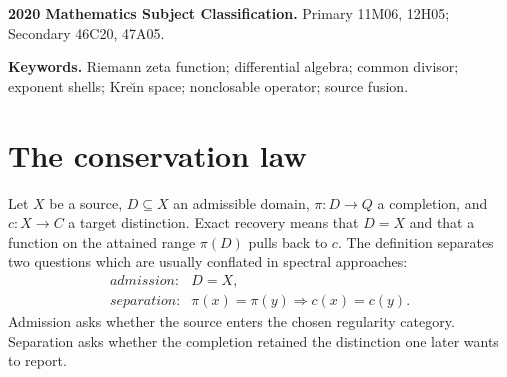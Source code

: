 \documentclass[11pt]{article}
\theoremstyle{definition}
\theoremstyle{remark}
\begin{document}
\begin{abstract}
The resulting law subsumes the audited source mechanisms by one exact defect ledger.  Finite
signature is its linear separation defect, a middle fibre or Tor class its homological defect, a
dense radical its topological defect, an all-orders-flat ideal its filtered defect, and failure of
absolute nuclearity its operator-ideal admission defect.  Wold--Poisson and holomorphic strip
transport are positive pre-completion lifts; Weil, Ward, Sonin, Calkin, and sharp-window
constructions are terminal consumers.  Under unit shell response, finite-Rees reflected sewing,
and invariant scalarization, every source-only Riemann selector is forced to be nonclosable in
breadth and beyond every finite Rees order in depth.  No zero-exclusion or
Riemann-hypothesis claim is made.  A positive escape is nevertheless explicit on every finite
packet: phasing the calibrated Julia--Gamma exterior current by its own source height makes it
Hermitian, with nonnegative energy before the first phase wrap and strict positivity whenever two
retained heights differ.  A phase-free diameter theorem then shows that every uniformly bounded
complex polarization of this exterior current is too small by a logarithmic factor on the
first-clock prime blocks, including arbitrarily wrapped and packet-dependent phases.
The full Jordan positive part of the rank-two exterior matrix has the same logarithmic ceiling,
so terminal spectral projection cannot recover the missing capacity.
On the singular depth channel, the literal Wold-vacuum truncations have reporter
$H_N(-u\Xi'/\Xi)+o(H_N)$; hence every lower-semicontinuous two-homogeneous capacity which
detects that connection violates a uniform scalar budget.
\end{abstract}

\medskip
\noindent\textbf{2020 Mathematics Subject Classification.}
Primary 11M06, 12H05; Secondary 46C20, 47A05.

\noindent\textbf{Keywords.}
Riemann zeta function; differential algebra; common divisor; exponent shells; Kre\u\i n space;
nonclosable operator; source fusion.

\section{The conservation law}

Let $X$ be a source, $D\subseteq X$ an admissible domain, $\pi:D\to Q$ a completion, and
$c:X\to C$ a target distinction.  Exact recovery means that $D=X$ and that a function on the
attained range $\pi(D)$ pulls back to $c$.  The definition separates two questions which are
usually conflated in spectral approaches:
\[
\begin{array}{ll}
\textit{admission:} & D=X,\\[2mm]
\textit{separation:} & \pi(x)=\pi(y)\Longrightarrow c(x)=c(y).
\end{array}
\tag{1.1}
\]
Admission asks whether the source enters the chosen regularity category.  Separation asks whether
the completion retained the distinction one later wants to report.
\end{document}
